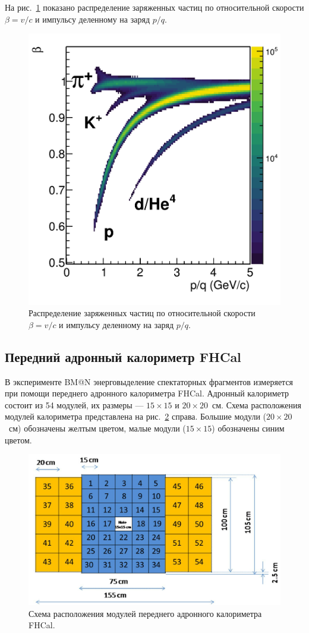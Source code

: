 На рис.~\ref{fig:bmn_beta_pq} показано распределение заряженных частиц по относительной скорости $\beta=v/c$ и импульсу деленному на заряд $p/q$.
%
\begin{figure}[ht]
\begin{center}
\includegraphics[width=0.55\linewidth]{images/beta_pq.png}
\caption{Распределение заряженных частиц по относительной скорости $\beta=v/c$ и импульсу деленному на заряд $p/q$.}
\label{fig:bmn_beta_pq}
\end{center}
\end{figure}

\subsection{Передний адронный калориметр FHCal}

В эксперименте BM@N энерговыделение спектаторных фрагментов измеряется при помощи переднего адронного калориметра FHCal.
Адронный калориметр состоит из 54 модулей, их размеры --- $15\times15$ и $20\times20$~см.
Схема расположения модулей калориметра представлена на рис.~\ref{fig:fhcal_layout} справа.
Большие модули ($20\times20$~см) обозначены желтым цветом, малые модули ($15\times15$) обозначены синим цветом. 
%
\begin{figure}[ht]
\begin{center}
\includegraphics[width=0.55\linewidth]{images/FHCal_modules.png}
\caption{Схема расположения модулей переднего адронного калориметра FHCal.}
\label{fig:fhcal_layout}
\end{center}
\end{figure}

